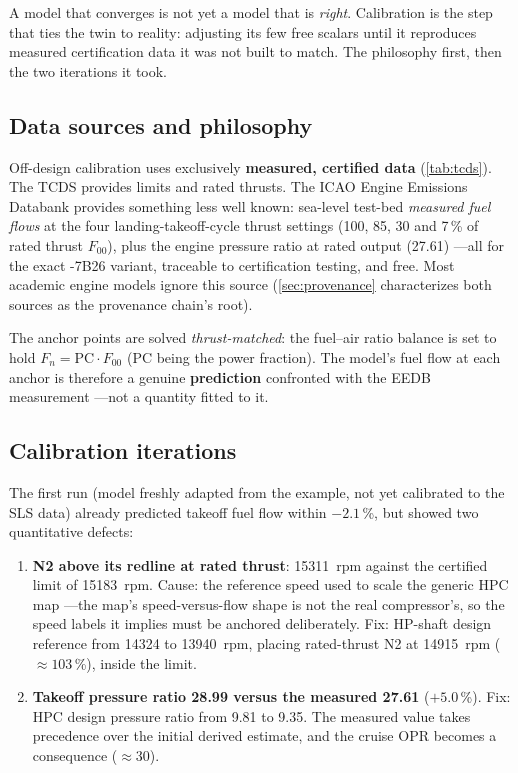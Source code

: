 A model that converges is not yet a model that is \emph{right}. Calibration is the step that
ties the twin to reality: adjusting its few free scalars until it reproduces measured
certification data it was not built to match. The philosophy first, then the two iterations
it took.

\subsection{Data sources and philosophy}

Off-design calibration uses exclusively \textbf{measured, certified data} (\cref{tab:tcds}).
The TCDS provides limits and rated thrusts. The ICAO Engine Emissions Databank provides
something less well known: sea-level test-bed \emph{measured fuel flows} at the four
landing-takeoff-cycle thrust settings (100, 85, 30 and 7\,\% of rated thrust $F_{00}$), plus
the engine pressure ratio at rated output (27.61) ---all for the exact -7B26 variant, traceable
to certification testing, and free. Most academic engine models ignore this source (\cref{sec:provenance} characterizes both sources as the provenance chain's root).

The anchor points are solved \emph{thrust-matched}: the fuel--air ratio balance is set to hold
$F_n = \mathrm{PC}\cdot F_{00}$ (PC being the power fraction). The model's fuel flow at each
anchor is therefore a genuine \textbf{prediction} confronted with the EEDB measurement ---not a
quantity fitted to it.

\subsection{Calibration iterations}

The first run (model freshly adapted from the example, not yet calibrated to the SLS data)
already predicted takeoff fuel flow within $-2.1$\,\%, but showed two quantitative defects:

\begin{enumerate}
  \item \textbf{N2 above its redline at rated thrust}: \SI{15311}{rpm} against the certified
    limit of \SI{15183}{rpm}. Cause: the reference speed used to scale the generic HPC map
    ---the map's speed-versus-flow shape is not the real compressor's, so the speed labels it
    implies must be anchored deliberately. Fix: HP-shaft design reference from \SI{14324}{} to
    \SI{13940}{rpm}, placing rated-thrust N2 at \SI{14915}{rpm} ($\approx103$\,\%), inside the
    limit.
  \item \textbf{Takeoff pressure ratio 28.99 versus the measured 27.61} ($+5.0$\,\%). Fix: HPC
    design pressure ratio from 9.81 to 9.35. The measured value takes precedence over the
    initial derived estimate, and the cruise OPR becomes a consequence ($\approx30$).
\end{enumerate}

